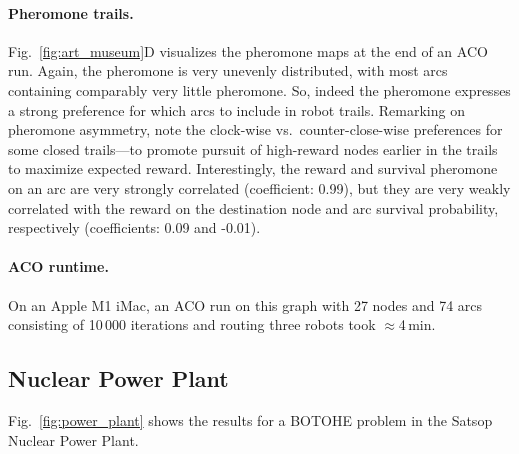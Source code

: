 \documentclass[fleqn,10pt,lineno]{wlpeerj}
\begin{document}
\paragraph{Pheromone trails.}
Fig.~\ref{fig:art_museum}D visualizes the pheromone maps at the end of an ACO run.
Again, the pheromone is very unevenly distributed, with most arcs containing comparably very little pheromone. So, indeed the pheromone expresses a strong preference for which arcs to include in robot trails.
Remarking on pheromone asymmetry, note the clock-wise vs.\ counter-close-wise preferences for some closed trails---to promote pursuit of high-reward nodes earlier in the trails to maximize expected reward.
Interestingly, the reward and survival pheromone on an arc are very strongly correlated (coefficient: 0.99), but they are very weakly correlated with the reward on the destination node and arc survival probability, respectively (coefficients: 0.09 and -0.01). 

\paragraph{ACO runtime.} On an Apple M1 iMac, an ACO run on this graph with 27 nodes and 74 arcs consisting of 10\,000 iterations and routing three robots took $\approx$4\,min.

\subsection{Nuclear Power Plant}
Fig.~\ref{fig:power_plant} shows the results for a BOTOHE problem in the Satsop Nuclear Power Plant.
\end{document}
